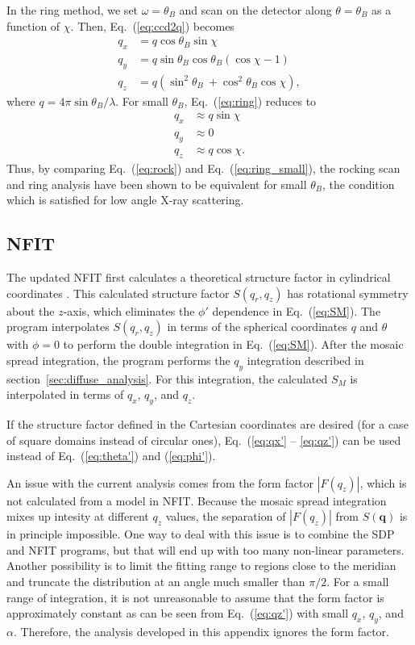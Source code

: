 In the ring method, we set $\omega=\theta_B$ and scan on the detector
along $\theta=\theta_B$ as a function of $\chi$. 
Then, Eq.~(\ref{eq:ccd2q}) becomes
\begin{align}
  q_x &= q\cos\theta_B\sin\chi \nonumber\\
  q_y &= q\sin\theta_B\cos\theta_B(\cos\chi-1) \nonumber\\
  q_z &= q(\sin^2\theta_B\ + \cos^2\theta_B\cos\chi),
  \label{eq:ring}
\end{align}
where $q=4\pi\sin\theta_B/\lambda$. For small $\theta_B$, Eq.~(\ref{eq:ring})
reduces to
\begin{align}
  q_x &\approx q\sin\chi \nonumber\\
  q_y &\approx 0 \nonumber\\
  q_z &\approx q\cos\chi.
  \label{eq:ring_small}
\end{align}
Thus, by comparing Eq.~(\ref{eq:rock}) and Eq.~(\ref{eq:ring_small}),
the rocking scan and ring analysis have been shown to be equivalent for small $\theta_B$,
the condition which is satisfied for low angle X-ray scattering.

\subsection{NFIT}
The updated NFIT first calculates a theoretical structure factor in 
cylindrical coordinates \cite{Lyatskaya01}. This calculated structure factor $S(q_r,q_z)$
has rotational symmetry about the $z$-axis, which eliminates the $\phi'$ dependence
in Eq.~(\ref{eq:SM}). The program interpolates $S(q_r,q_z)$ in terms
of the spherical coordinates $q$ and $\theta$ with $\phi=0$ 
to perform the double integration in Eq.~(\ref{eq:SM}). 
After the mosaic spread integration, the program performs the $q_y$ integration
described in section~\ref{sec:diffuse_analysis}.
For this integration, the calculated $S_M$ is interpolated 
in terms of $q_x$, $q_y$, and $q_z$.

If the structure factor defined in the Cartesian coordinates are desired
(for a case of square domains instead of circular ones),
Eq.~(\ref{eq:qx'} -- \ref{eq:qz'}) can be used instead of 
Eq.~(\ref{eq:theta'}) and (\ref{eq:phi'}).

An issue with the current analysis comes from the form factor $|F(q_z)|$,
which is not calculated from a model in NFIT. Because the mosaic
spread integration mixes up intesity at different $q_z$ values, 
the separation of $|F(q_z)|$ from $S(\mathbf{q})$ is in principle impossible. 
One way to deal with this issue is to combine the SDP and NFIT programs, but
that will end up with too many non-linear parameters.
Another possibility is to limit the fitting range to regions close to the meridian
and truncate the distribution at an angle much smaller than $\pi/2$. 
For a small range of integration, it is not unreasonable to assume that
the form factor is approximately constant as can be seen from 
Eq.~(\ref{eq:qz'}) with small $q_x$, $q_y$, and $\alpha$. 
Therefore, the analysis developed in this appendix ignores the form factor.

